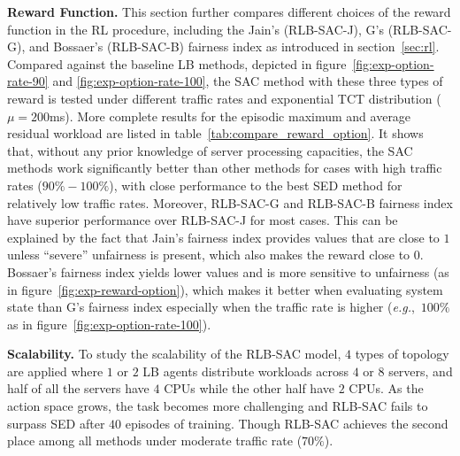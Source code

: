 \documentclass{article}
\newcommand{\eg}{\textit{e.g.},\ }
\begin{document}
\textbf{Reward Function.} This section further compares different choices of the reward function in the RL procedure, including the Jain's (RLB-SAC-J), G's (RLB-SAC-G), and Bossaer's (RLB-SAC-B) fairness index as introduced in section~\ref{sec:rl}.
Compared against the baseline LB methods, depicted in figure~\ref{fig:exp-option-rate-90} and \ref{fig:exp-option-rate-100}, the SAC method with these three types of reward is tested under different traffic rates and exponential TCT distribution ($\mu=200$ms).
More complete results for the episodic maximum and average residual workload are listed in table~\ref{tab:compare_reward_option}.
It shows that, without any prior knowledge of server processing capacities, the SAC methods work significantly better than other methods for cases with high traffic rates ($90\%-100\%$), with close performance to the best SED method for relatively low traffic rates.
Moreover, RLB-SAC-G and RLB-SAC-B fairness index have superior performance over RLB-SAC-J for most cases.
This can be explained by the fact that Jain's fairness index provides values that are close to $1$ unless ``severe'' unfairness is present, which also makes the reward close to $0$.
Bossaer's fairness index yields lower values and is more sensitive to unfairness (as in figure~\ref{fig:exp-reward-option}), which makes it better when evaluating system state than G's fairness index especially when the traffic rate is higher (\eg $100\%$ as in figure~\ref{fig:exp-option-rate-100}).

\textbf{Scalability.}
To study the scalability of the RLB-SAC model, $4$ types of topology are applied where $1$ or $2$ LB agents distribute workloads across $4$ or $8$ servers, and half of all the servers have $4$ CPUs while the other half have $2$ CPUs.
As the action space grows, the task becomes more challenging and RLB-SAC fails to surpass SED after $40$ episodes of training.
Though RLB-SAC achieves the second place among all methods under moderate traffic rate ($70\%$).
\end{document}
